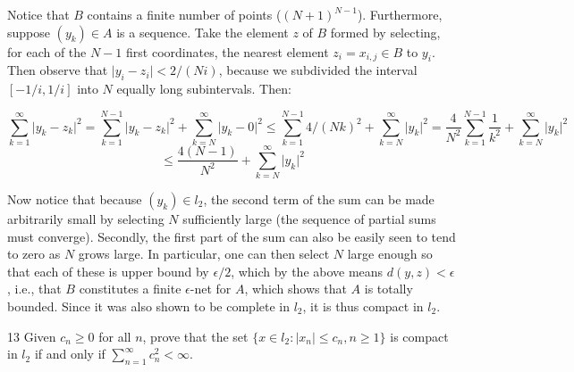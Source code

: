 \begin{solution}
    Notice that $B$ contains a finite number of points ($(N + 1)^{N-1}$).
    Furthermore, suppose $(y_k) \in A$ is a sequence.
    Take the element $z$ of $B$ formed by selecting, for each of the $N - 1$ first coordinates, the nearest element $z_i = x_{i, j} \in B$ to $y_i$.
    Then observe that $\lvert y_i - z_i \rvert < 2/(Ni)$, because we subdivided the interval $[-1/i, 1/i]$ into $N$ equally long subintervals.
    Then:

    \[\sum_{k=1}^{\infty} \lvert y_k - z_k \rvert^2 = \sum_{k = 1}^{N - 1} \lvert y_k - z_k \rvert^2 + \sum_{k=N}^{\infty} \lvert y_k - 0 \rvert^2  \leq \sum_{k=1}^{N-1} 4/(Nk)^2 + \sum_{k=N}^{\infty} \lvert y_k \rvert^2 = \frac{4}{N^2} \sum_{k=1}^{N-1} \frac{1}{k^2} + \sum_{k=N}^{\infty} \lvert y_k \rvert^2\]
    \[\leq \frac{4(N - 1)}{N^2} + \sum_{k=N}^{\infty} \lvert y_k \rvert^2\]

    Now notice that because $(y_k) \in l_2$, the second term of the sum can be made arbitrarily small by selecting $N$ sufficiently large (the sequence of partial sums must converge).
    Secondly, the first part of the sum can also be easily seen to tend to zero as $N$ grows large.
    In particular, one can then select $N$ large enough so that each of these is upper bound by $\epsilon/2$, which by the above means $d(y, z) < \epsilon$, i.e., that $B$ constitutes a finite $\epsilon$-net for $A$, which shows that $A$ is totally bounded.
    Since it was also shown to be complete in $l_2$, it is thus compact in $l_2$.
\end{solution}

\begin{exercise}{13}
    Given $c_n \geq 0$ for all $n$, prove that the set $\{x \in l_2: \lvert x_n \rvert \leq c_n, n \geq 1\}$ is compact in $l_2$ if and only if $\sum_{n=1}^{\infty} c_n^2 < \infty$.
\end{exercise}

